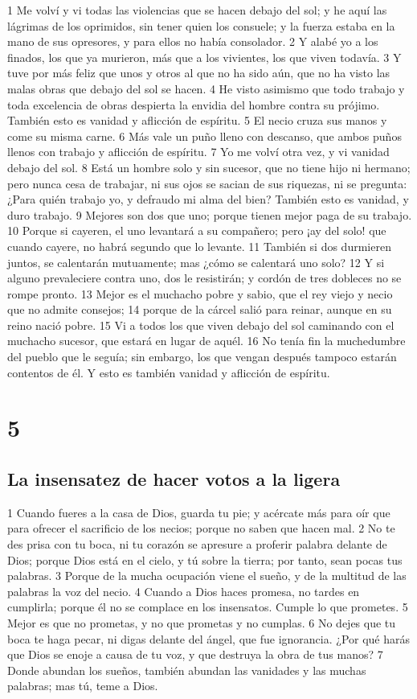 1 Me volví y vi todas las violencias que se hacen debajo del sol; y he aquí las lágrimas de los oprimidos, sin tener quien los consuele; y la fuerza estaba en la mano de sus opresores, y para ellos no había consolador.
2 Y alabé yo a los finados, los que ya murieron, más que a los vivientes, los que viven todavía.
3 Y tuve por más feliz que unos y otros al que no ha sido aún, que no ha visto las malas obras que debajo del sol se hacen.
4 He visto asimismo que todo trabajo y toda excelencia de obras despierta la envidia del hombre contra su prójimo. También esto es vanidad y aflicción de espíritu.
5 El necio cruza sus manos y come su misma carne.
6 Más vale un puño lleno con descanso, que ambos puños llenos con trabajo y aflicción de espíritu.
7 Yo me volví otra vez, y vi vanidad debajo del sol.
8 Está un hombre solo y sin sucesor, que no tiene hijo ni hermano; pero nunca cesa de trabajar, ni sus ojos se sacian de sus riquezas, ni se pregunta: ¿Para quién trabajo yo, y defraudo mi alma del bien? También esto es vanidad, y duro trabajo.
9 Mejores son dos que uno; porque tienen mejor paga de su trabajo.
10 Porque si cayeren, el uno levantará a su compañero; pero ¡ay del solo! que cuando cayere, no habrá segundo que lo levante.
11 También si dos durmieren juntos, se calentarán mutuamente; mas ¿cómo se calentará uno solo?
12 Y si alguno prevaleciere contra uno, dos le resistirán; y cordón de tres dobleces no se rompe pronto.
13 Mejor es el muchacho pobre y sabio, que el rey viejo y necio que no admite consejos;
14 porque de la cárcel salió para reinar, aunque en su reino nació pobre.
15 Vi a todos los que viven debajo del sol caminando con el muchacho sucesor, que estará en lugar de aquél.
16 No tenía fin la muchedumbre del pueblo que le seguía; sin embargo, los que vengan después tampoco estarán contentos de él. Y esto es también vanidad y aflicción de espíritu.

\chapter{5}

\section*{La insensatez de hacer votos a la ligera}

1 Cuando fueres a la casa de Dios, guarda tu pie; y acércate más para oír que para ofrecer el sacrificio de los necios; porque no saben que hacen mal.
2 No te des prisa con tu boca, ni tu corazón se apresure a proferir palabra delante de Dios; porque Dios está en el cielo, y tú sobre la tierra; por tanto, sean pocas tus palabras.
3 Porque de la mucha ocupación viene el sueño, y de la multitud de las palabras la voz del necio.
4 Cuando a Dios haces promesa, no tardes en cumplirla; porque él no se complace en los insensatos. Cumple lo que prometes. 
5 Mejor es que no prometas, y no que prometas y no cumplas.
6 No dejes que tu boca te haga pecar, ni digas delante del ángel, que fue ignorancia. ¿Por qué harás que Dios se enoje a causa de tu voz, y que destruya la obra de tus manos?
7 Donde abundan los sueños, también abundan las vanidades y las muchas palabras; mas tú, teme a Dios.

